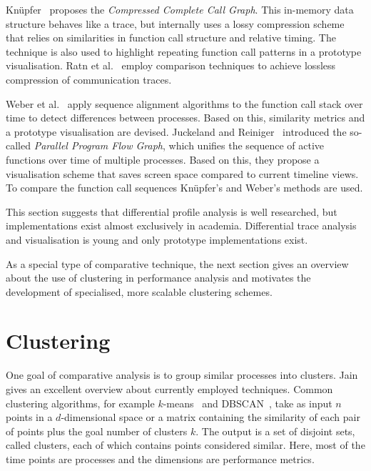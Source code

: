 \documentclass[a4paper, final, diplominf]{zih-template}
\begin{document}
Kn\"upfer~\cite{knuepfer07,knuepfer08a} proposes the \emph{Compressed Complete Call Graph}.
This in-memory data structure behaves like a trace, but internally uses a lossy compression scheme that relies on similarities in function call structure and relative timing.
The technique is also used to highlight repeating function call patterns in a prototype visualisation.
Ratn et al.~\cite{ratn08} employ comparison techniques to achieve lossless compression of communication traces.

Weber et al.~\cite{weber12, weber13} apply sequence alignment algorithms to the function call stack over time to detect differences between processes.
Based on this, similarity metrics and a prototype visualisation are devised.
Juckeland and Reiniger~\cite{juckeland12, reiniger13} introduced the so-called \emph{Parallel Program Flow Graph}, which unifies the sequence of active functions over time of multiple processes.
Based on this, they propose a visualisation scheme that saves screen space compared to current timeline views.
To compare the function call sequences Kn\"upfer's and Weber's methods are used.

This section suggests that differential profile analysis is well researched, but implementations exist almost exclusively in academia.
Differential trace analysis and visualisation is young and only prototype implementations exist.

As a special type of comparative technique, the next section gives an overview about the use of clustering in performance analysis and motivates the development of specialised, more scalable clustering schemes.

\section{Clustering}
\label{sec:background-clustering}
One goal of comparative analysis is to group similar processes into clusters.
Jain~\cite{jain10} gives an excellent overview about currently employed techniques.
Common clustering algorithms, for example $k$-means~\cite{forgy65, lloyd82, macqueen67, steinhaus56} and DBSCAN~\cite{ester96}, take as input $n$ points in a $d$-dimensional space or a matrix containing the similarity of each pair of points plus the goal number of clusters $k$.
The output is a set of disjoint sets, called clusters, each of which contains points considered similar.
Here, most of the time points are processes and the dimensions are performance metrics.
\end{document}
